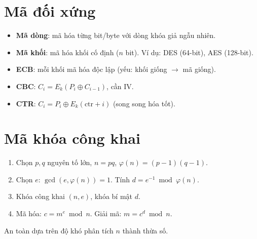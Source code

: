 \documentclass[12pt,a4paper]{article}
\begin{document}
\section{Mã đối xứng}

\begin{dinhnghia}[title={Mã dòng và mã khối}]
  \begin{itemize}
    \item \textbf{Mã dòng}: mã hóa từng bit/byte với dòng khóa giả ngẫu nhiên.
    \item \textbf{Mã khối}: mã hóa khối cố định ($n$ bit). Ví dụ: DES (64-bit), AES (128-bit).
  \end{itemize}
\end{dinhnghia}

\begin{dinhnghia}[title={Chế độ hoạt động mã khối}]
  \begin{itemize}
    \item \textbf{ECB}: mỗi khối mã hóa độc lập (yếu: khối giống $\to$ mã giống).
    \item \textbf{CBC}: $C_i = E_k(P_i \oplus C_{i-1})$, cần IV.
    \item \textbf{CTR}: $C_i = P_i \oplus E_k(\text{ctr} + i)$ (song song hóa tốt).
  \end{itemize}
\end{dinhnghia}

\section{Mã khóa công khai}

\begin{phuongphap}[title={RSA}]
  \begin{enumerate}
    \item Chọn $p, q$ nguyên tố lớn, $n = pq$, $\varphi(n) = (p-1)(q-1)$.
    \item Chọn $e$: $\gcd(e, \varphi(n)) = 1$. Tính $d = e^{-1} \bmod \varphi(n)$.
    \item Khóa công khai $(n, e)$, khóa bí mật $d$.
    \item Mã hóa: $c = m^e \bmod n$. Giải mã: $m = c^d \bmod n$.
  \end{enumerate}
  An toàn dựa trên độ khó phân tích $n$ thành thừa số.
\end{phuongphap}
\end{document}
